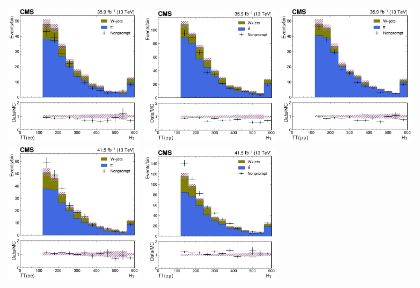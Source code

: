 \begin{figure}
  \centering
  \includegraphics[width=0.31\textwidth]{closure/2016/ht_TT_EE.png} \hfill
  \includegraphics[width=0.31\textwidth]{closure/2016/ht_TT_EM.png} \hfill
  \includegraphics[width=0.31\textwidth]{closure/2016/ht_TT_MM.png} \\
  \includegraphics[width=0.31\textwidth]{closure/2017/ht_TT_EE.png} \hfill
  \includegraphics[width=0.31\textwidth]{closure/2017/ht_TT_EM.png} \hfill

\end{figure}
